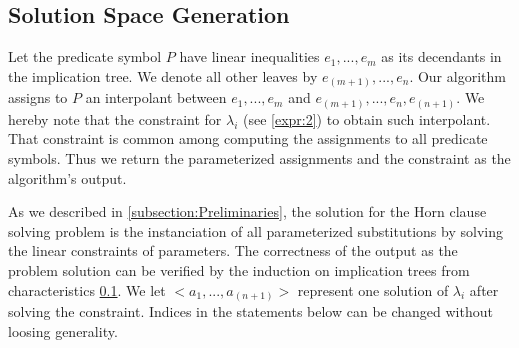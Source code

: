 \documentclass{llncs}
\begin{document}
\subsection{Solution Space Generation}

Let the predicate symbol $P$ have linear inequalities $e_1,...,e_m$ as its decendants in the implication tree. We denote all other leaves by $e_(m+1),...,e_n$. Our algorithm assigns to $P$ an interpolant between $e_1,...,e_m$ and $e_(m+1),...,e_n,e_(n+1)$. We hereby note that the constraint for $\lambda_i$ (see \ref{expr:2}) to obtain such interpolant. That constraint is common among computing the assignments to all predicate symbols. Thus we return the parameterized assignments and the constraint as the algorithm's output.

As we described in \ref{subsection:Preliminaries}, the solution for the Horn clause solving problem is the instanciation of all parameterized substitutions by solving the linear constraints of parameters. The correctness of the output as the problem solution can be verified by the induction on implication trees from characteristics \ref{}. We let $<a_1,...,a_(n+1)>$ represent one solution of $\lambda_i$ after solving the constraint. Indices in the statements below can be changed without loosing generality.
\end{document}
